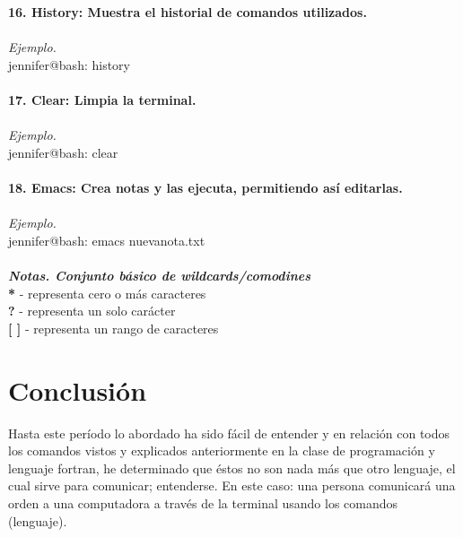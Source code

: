 \documentclass{article}
\begin{document}
\\\\
\textbf{16. History: Muestra el historial de comandos utilizados.}
\\\\\textit{Ejemplo.}
\\jennifer@bash: history
\\\\
\textbf{17. Clear: Limpia la terminal.}
\\\\\textit{Ejemplo.}
\\jennifer@bash: clear
\\\\
\textbf{18. Emacs: Crea notas y las ejecuta, permitiendo así editarlas.}
\\\\\textit{Ejemplo.}
\\jennifer@bash: emacs nuevanota.txt\\\\

\textbf{\textit{Notas. Conjunto básico de wildcards/comodines}}\\
\textbf{*} - representa cero o más caracteres\\
\textbf{?} - representa un solo carácter\\
\textbf{[ ]} - representa un rango de caracteres

\section{Conclusión}
Hasta este período lo abordado ha sido fácil de entender y en relación con todos los comandos vistos y explicados anteriormente en la clase de programación y lenguaje fortran, he determinado que éstos no son nada más que otro lenguaje, el cual sirve para comunicar; entenderse. En este caso: una persona comunicará una orden a una computadora a través de la terminal usando los comandos (lenguaje).
\end{document}
